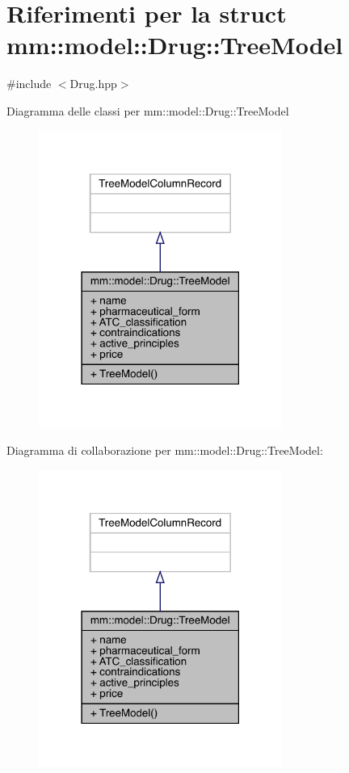 \hypertarget{structmm_1_1model_1_1_drug_1_1_tree_model}{}\section{Riferimenti per la struct mm\+:\+:model\+:\+:Drug\+:\+:Tree\+Model}
\label{structmm_1_1model_1_1_drug_1_1_tree_model}


{\ttfamily \#include $<$Drug.\+hpp$>$}



Diagramma delle classi per mm\+:\+:model\+:\+:Drug\+:\+:Tree\+Model\nopagebreak
\begin{figure}[H]
\begin{center}
\leavevmode
\includegraphics[width=226pt]{db/d60/structmm_1_1model_1_1_drug_1_1_tree_model__inherit__graph}
\end{center}
\end{figure}


Diagramma di collaborazione per mm\+:\+:model\+:\+:Drug\+:\+:Tree\+Model\+:\nopagebreak
\begin{figure}[H]
\begin{center}
\leavevmode
\includegraphics[width=226pt]{d9/d7b/structmm_1_1model_1_1_drug_1_1_tree_model__coll__graph}
\end{center}
\end{figure}
